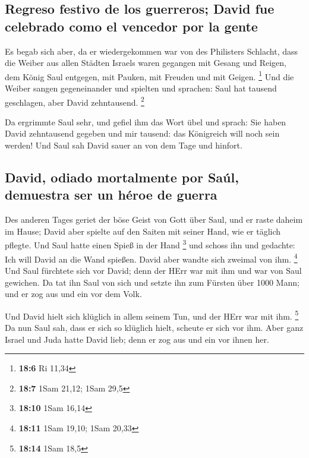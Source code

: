 \hypertarget{regreso-festivo-de-los-guerreros-david-fue-celebrado-como-el-vencedor-por-la-gente}{%
\subsection{Regreso festivo de los guerreros; David fue celebrado como
el vencedor por la
gente}\label{regreso-festivo-de-los-guerreros-david-fue-celebrado-como-el-vencedor-por-la-gente}}

 Es begab sich aber, da er wiedergekommen war von des
Philisters Schlacht, dass die Weiber aus allen Städten Israels waren
gegangen mit Gesang und Reigen, dem König Saul entgegen, mit Pauken, mit
Freuden und mit Geigen. \footnote{\textbf{18:6} Ri 11,34} 
Und die Weiber sangen gegeneinander und spielten und sprachen: Saul hat
tausend geschlagen, aber David zehntausend. \footnote{\textbf{18:7} 1Sam
  21,12; 1Sam 29,5}

 Da ergrimmte Saul sehr, und gefiel ihm das Wort übel und
sprach: Sie haben David zehntausend gegeben und mir tausend: das
Königreich will noch sein werden!  Und Saul sah David
sauer an von dem Tage und hinfort.

\hypertarget{david-odiado-mortalmente-por-sauxfal-demuestra-ser-un-huxe9roe-de-guerra}{%
\subsection{David, odiado mortalmente por Saúl, demuestra ser un héroe
de
guerra}\label{david-odiado-mortalmente-por-sauxfal-demuestra-ser-un-huxe9roe-de-guerra}}

 Des anderen Tages geriet der böse Geist von Gott über
Saul, und er raste daheim im Hause; David aber spielte auf den Saiten
mit seiner Hand, wie er täglich pflegte. Und Saul hatte einen Spieß in
der Hand \footnote{\textbf{18:10} 1Sam 16,14}  und schoss
ihn und gedachte: Ich will David an die Wand spießen. David aber wandte
sich zweimal von ihm. \footnote{\textbf{18:11} 1Sam 19,10; 1Sam 20,33}
 Und Saul fürchtete sich vor David; denn der HErr war mit
ihm und war von Saul gewichen.  Da tat ihn Saul von sich
und setzte ihn zum Fürsten über 1000 Mann; und er zog aus und ein vor
dem Volk.

 Und David hielt sich klüglich in allem seinem Tun, und
der HErr war mit ihm. \footnote{\textbf{18:14} 1Sam 18,5}
 Da nun Saul sah, dass er sich so klüglich hielt, scheute
er sich vor ihm.  Aber ganz Israel und Juda hatte David
lieb; denn er zog aus und ein vor ihnen her.

